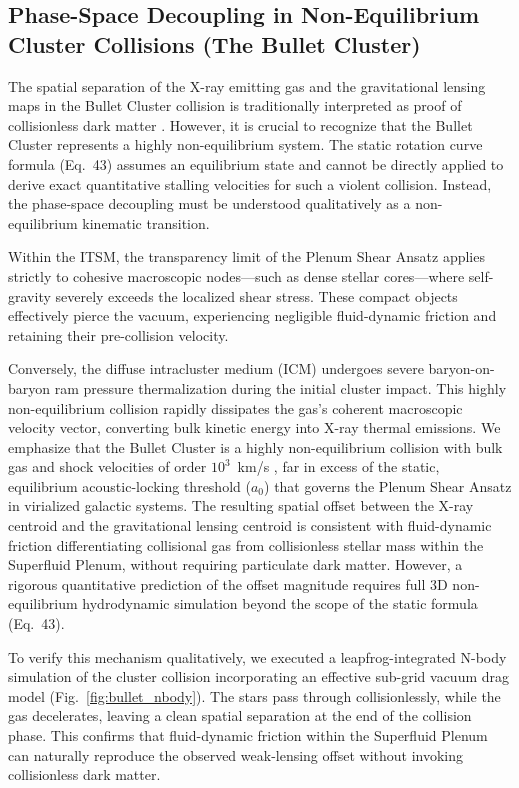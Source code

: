 \documentclass[aps,prd,10pt,twocolumn,superscriptaddress,nofootinbib,floatfix]{revtex4-2}
\begin{document}
\subsection{Phase-Space Decoupling in Non-Equilibrium Cluster Collisions (The Bullet Cluster)}
The spatial separation of the X-ray emitting gas and the gravitational lensing maps in the Bullet Cluster collision is traditionally interpreted as proof of collisionless dark matter \cite{bullet}. However, it is crucial to recognize that the Bullet Cluster represents a highly non-equilibrium system. The static rotation curve formula (Eq.~43) assumes an equilibrium state and cannot be directly applied to derive exact quantitative stalling velocities for such a violent collision. Instead, the phase-space decoupling must be understood qualitatively as a non-equilibrium kinematic transition.

Within the ITSM, the transparency limit of the Plenum Shear Ansatz applies strictly to cohesive macroscopic nodes---such as dense stellar cores---where self-gravity severely exceeds the localized shear stress. These compact objects effectively pierce the vacuum, experiencing negligible fluid-dynamic friction and retaining their pre-collision velocity.

Conversely, the diffuse intracluster medium (ICM) undergoes severe baryon-on-baryon ram pressure thermalization during the initial cluster impact. This highly non-equilibrium collision rapidly dissipates the gas's coherent macroscopic velocity vector, converting bulk kinetic energy into X-ray thermal emissions. We emphasize that the Bullet Cluster is a highly non-equilibrium collision with bulk gas and shock velocities of order $10^3$~km/s \cite{bullet}, far in excess of the static, equilibrium acoustic-locking threshold ($a_0$) that governs the Plenum Shear Ansatz in virialized galactic systems. The resulting spatial offset between the X-ray centroid and the gravitational lensing centroid is consistent with fluid-dynamic friction differentiating collisional gas from collisionless stellar mass within the Superfluid Plenum, without requiring particulate dark matter. However, a rigorous quantitative prediction of the offset magnitude requires full 3D non-equilibrium hydrodynamic simulation beyond the scope of the static formula (Eq.~43).

To verify this mechanism qualitatively, we executed a leapfrog-integrated N-body simulation of the cluster collision incorporating an effective sub-grid vacuum drag model (Fig.~\ref{fig:bullet_nbody}). The stars pass through collisionlessly, while the gas decelerates, leaving a clean spatial separation at the end of the collision phase. This confirms that fluid-dynamic friction within the Superfluid Plenum can naturally reproduce the observed weak-lensing offset without invoking collisionless dark matter.
\end{document}
